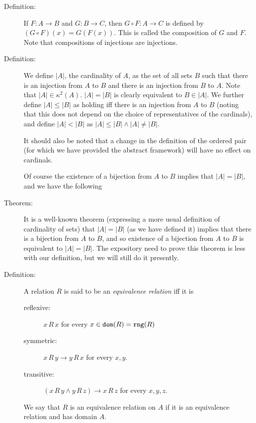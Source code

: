 \documentclass[12pt]{article}
\begin{document}
\begin{description}
\item[Definition:]  If $F:A \rightarrow B$ and $G:B \rightarrow C$, then $G \circ F:A \rightarrow C$ is defined
by $(G \circ F)(x) = G(F(x))$.  This is called the composition of $G$ and $F$.  Note that compositions of injections are injections.

\item[Definition:] We define $|A|$, the cardinality of $A$, as the set of all sets $B$ such that there is an injection from $A$ to $B$ and there is an injection from $B$ to $A$.   Note that $|A| \in \kappa^2(A)$.  $|A| = |B|$ is clearly equivalent to $B \in |A|$.  We further define $|A|\leq |B|$ as holding
iff there is an injection from $A$ to $B$ (noting that this does not depend on the choice of representatives of the cardinals), and define $|A|<|B|$ as $|A| \leq |B| \wedge |A| \neq |B|$.

It should also be noted that a change in the definition of the ordered pair (for which we have provided the abstract framework) will have no effect on cardinals.

Of course the existence of a bijection from $A$ to $B$ implies that $|A|=|B|$, and we have the following

\item[Theorem:]  It is a well-known theorem (expressing a more usual definition of cardinality of sets) that
$|A| = |B|$ (as we have defined it) implies that there is a bijection from $A$ to $B$, and so existence of a bijection from $A$ to $B$ is equivalent to $|A|=|B|$.  The expository need to prove this theorem is less with our definition, but we will still do it presently.

\item[Definition:]  A relation $R$ is said to be an {\em equivalence relation\/} iff it is

\begin{description}

\item[reflexive:]  $x \, R \, x$ for every $x \in {\tt dom}(R)={\tt rng}(R)$

\item[symmetric:]  $x \, R \, y \rightarrow y \, R\, x$ for every $x,y$.

\item[transitive:]  $(x \, R \, y \wedge y \, R\, z) \rightarrow x \, R \, z$ for every $x,y,z$.

\end{description}

We say that $R$ is an equivalence relation on $A$ if it is an equivalence relation and has domain $A$.


\end{description}
\end{document}
